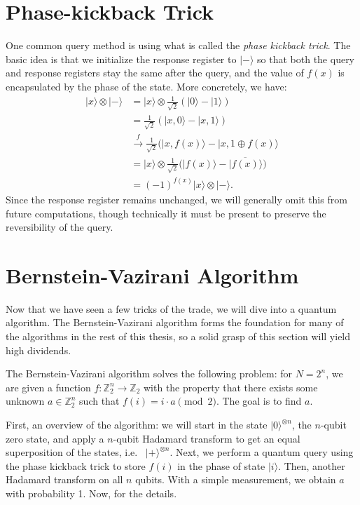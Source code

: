 \documentclass[12pt,twoside]{reedthesis}
\theoremstyle{definition}
\newcommand{\Z}{\mathbb{Z}}
\newcommand{\ketz}{\ensuremath{\lvert 0\rangle}\xspace}
\newcommand{\keto}{\ensuremath{\lvert 1\rangle}\xspace}
\newcommand{\ket}[1]{\ensuremath{\lvert #1\rangle}\xspace}
\newcommand{\Hplus}{\ensuremath{\lvert + \rangle}\xspace}
\newcommand{\Hminus}{\ensuremath{\lvert- \rangle}\xspace}
\begin{document}
\section{Phase-kickback Trick}
 One common query method is using what is called the \textit{phase kickback trick}. The basic idea is that we initialize the response register to \Hminus so that both the query and response registers stay the same after the query, and the value of $f(x)$ is encapsulated by the phase of the state. More concretely, we have:
\begin{align*}
\ket{x} \otimes \Hminus 
& = \ket{x} \otimes \frac{1}{\sqrt{2}}(\ketz - \keto)\\
& = \frac{1}{\sqrt{2}}(\ket{x, 0} - \ket{x, 1}) \\
& \xrightarrow{f} \frac{1}{\sqrt{2}}(\ket{x, f(x)} - \ket{x, 1 \oplus f(x)} \\
& = \ket{x} \otimes \frac{1}{\sqrt{2}}\bigg(\ket{f(x)} - \ket{\overline{f(x)}}\bigg) \\
& = (-1)^{f(x)} \ket{x} \otimes \ket{ -}.
\end{align*}
Since the response register remains unchanged, we will generally omit this from future computations, though technically it must be present to preserve the reversibility of the query. 
\section{Bernstein-Vazirani Algorithm}

Now that we have seen a few tricks of the trade, we will dive into a quantum algorithm. The Bernstein-Vazirani algorithm forms the foundation for many of the algorithms in the rest of this thesis, so a solid grasp of this section will yield high dividends. 

The Bernstein-Vazirani algorithm solves the following problem: for $N = 2^n$, we are given a function $f: \Z_2^n \rightarrow \Z_2$ with the property that there exists some unknown $a \in \Z_2^n$ such that $f(i) = i \cdot a \pmod{2}$. The goal is to find $a$. 

First, an overview of the algorithm: we will start in the state $\ketz^{\otimes n}$, the $n$-qubit zero state, and apply a $n$-qubit Hadamard transform to get an equal superposition of the states, i.e.~ $\Hplus^{\otimes n}$. Next, we perform a quantum query using the phase kickback trick to store $f(i)$ in the phase of state $\ket{i}$. Then, another Hadamard transform on all $n$ qubits. With a simple measurement, we obtain $a$ with probability 1. Now, for the details.
\end{document}
